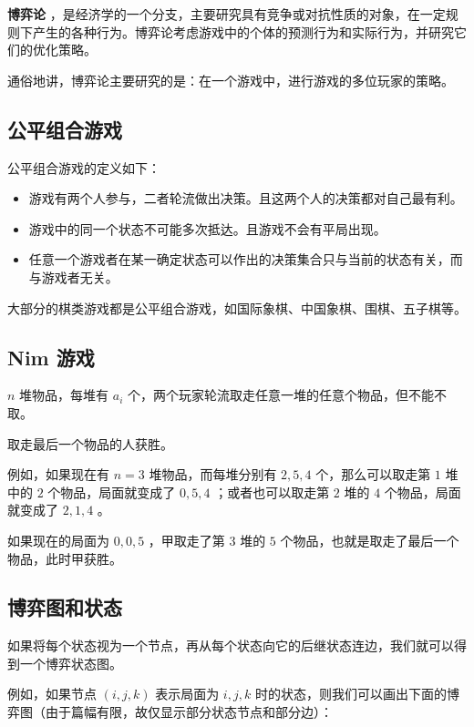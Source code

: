 
\textbf{ 博弈论 }，是经济学的一个分支，主要研究具有竞争或对抗性质的对象，在一定规则下产生的各种行为。博弈论考虑游戏中的个体的预测行为和实际行为，并研究它们的优化策略。

通俗地讲，博弈论主要研究的是：在一个游戏中，进行游戏的多位玩家的策略。

\subsection{公平组合游戏}

公平组合游戏的定义如下：

\begin{itemize}
\item 游戏有两个人参与，二者轮流做出决策。且这两个人的决策都对自己最有利。
\item 游戏中的同一个状态不可能多次抵达。且游戏不会有平局出现。
\item 任意一个游戏者在某一确定状态可以作出的决策集合只与当前的状态有关，而与游戏者无关。
\end{itemize}

大部分的棋类游戏都是公平组合游戏，如国际象棋、中国象棋、围棋、五子棋等。

\subsection{Nim 游戏}

$n$ 堆物品，每堆有 $a_i$ 个，两个玩家轮流取走任意一堆的任意个物品，但不能不取。

取走最后一个物品的人获胜。

例如，如果现在有 $n=3$ 堆物品，而每堆分别有 $2, 5, 4$ 个，那么可以取走第 $1$ 堆中的 $2$ 个物品，局面就变成了 $0, 5, 4$ ；或者也可以取走第 $2$ 堆的 $4$ 个物品，局面就变成了 $2, 1, 4$ 。

如果现在的局面为 $0, 0, 5$ ，甲取走了第 $3$ 堆的 $5$ 个物品，也就是取走了最后一个物品，此时甲获胜。

\subsection{博弈图和状态}

如果将每个状态视为一个节点，再从每个状态向它的后继状态连边，我们就可以得到一个博弈状态图。

例如，如果节点 $(i, j, k)$ 表示局面为 $i, j, k$ 时的状态，则我们可以画出下面的博弈图（由于篇幅有限，故仅显示部分状态节点和部分边）：

